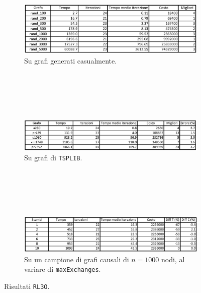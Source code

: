 \begin{figure}[H]
    \centering
    \begin{subfigure}{\linewidth}
        \centering
        \includegraphics[width=400pt]{img/RL3Orandom.png}
        \caption*{Su grafi generati casualmente.}
    \end{subfigure}
    \ \\
    \ \\
    \ \\
    \ \\
    \begin{subfigure}{\linewidth}
        \centering
        \includegraphics[width=400pt]{img/RL3Otsplib.png}
        \caption*{Su grafi di \texttt{TSPLIB}.}
    \end{subfigure}
    \ \\
    \ \\
    \ \\
    \ \\
    \begin{subfigure}{\linewidth}
        \centering
        \includegraphics[width=400pt]{img/RL3Oscambi.png}
        \caption*{Su un campione di grafi causali di $n=1000$ nodi, al variare di \texttt{maxExchanges}.}
    \end{subfigure}
    \caption{Risultati \texttt{RL3O}.}
\end{figure}
\ \\
\ \\

